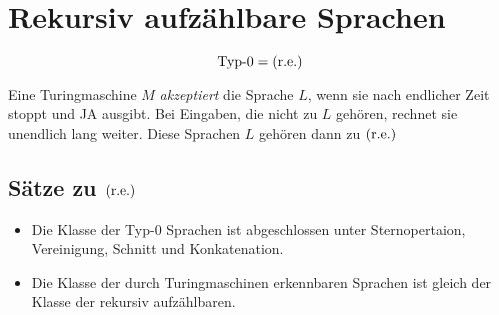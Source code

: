 \chapter{Rekursiv aufzählbare Sprachen}
\begin{equation*}
	\text{Typ-0} = \mathrm{(r.e.)}
\end{equation*}



Eine Turingmaschine $M$ \emph{akzeptiert} die Sprache $L$, wenn sie nach endlicher Zeit stoppt und JA ausgibt.
Bei Eingaben, die nicht zu $L$ gehören, rechnet sie unendlich lang weiter.
Diese Sprachen $L$ gehören dann zu $\mathrm{(r.e.)}$






\section{Sätze zu $\mathrm{(r.e.)}$}
\begin{itemize}
	\item Die Klasse der Typ-0 Sprachen ist abgeschlossen unter Sternopertaion, Vereinigung, Schnitt und Konkatenation.
	\item Die Klasse der durch Turingmaschinen erkennbaren Sprachen ist gleich der Klasse der rekursiv aufzählbaren.
\end{itemize}
